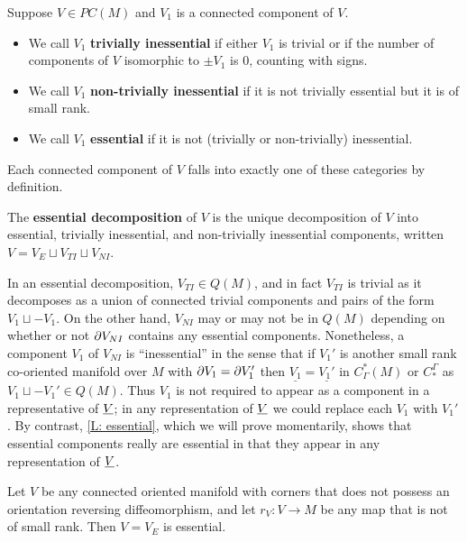 \begin{definition}\label{D: essential}
Suppose $V\in PC(M)$ and $V_1$ is a connected component of $V$.
\begin{itemize}
\item We call $V_1$ \textbf{trivially inessential} if either
$V_1$ is trivial or if the number of components of
$V$ isomorphic to $\pm V_1$ is $0$, counting with signs.

\item We call ${V_1}$ \textbf{non-trivially inessential} if it is not trivially essential but it is of small rank.

\item We call ${V_1}$ \textbf{essential} if it is not (trivially or non-trivially) inessential.
\end{itemize}

Each connected component of $V$ falls into exactly one of these categories by definition.

The \textbf{essential decomposition} of $V$ is the unique decomposition of $V$ into essential, trivially inessential, and non-trivially inessential components,
written $V=V_E\sqcup V_{TI}\sqcup V_{NI}$.
\end{definition}

In an essential decomposition, $V_{TI}\in Q(M)$, and in fact $V_{TI}$ is trivial as it decomposes as a union of connected trivial components and pairs of the form $V_1\sqcup -V_1$. On the other hand, $V_{NI}$ may or may not be in $Q(M)$ depending on whether or not $\partial V_{NI}$
contains any essential components. Nonetheless, a component $V_1$ of $V_{NI}$ is ``inessential'' in the sense that if $V_1'$ is another small rank co-oriented manifold over $M$ with $\partial V_1=\partial V_1'$ then $\underline{V_1}=\underline{V_1'}$ in $C_\Gamma^*(M)$ or $C_*^\Gamma$ as $V_1\sqcup -V_1'\in Q(M)$. Thus $V_1$ is not required to appear as a component in a representative of $\underline{V}$; in any representation of $\underline{V}$ we could replace each $V_1$ with $V_1'$. By contrast, \cref{L: essential}, which we will prove momentarily, shows that essential components really are essential in that they appear in any representation of $\underline{V}$.


\begin{example}
Let $V$ be any connected oriented manifold with corners that does not possess an orientation reversing diffeomorphism, and let $r_V:V\to M$ be any map that is not of small rank. Then $V=V_E$ is essential.
\end{example}

